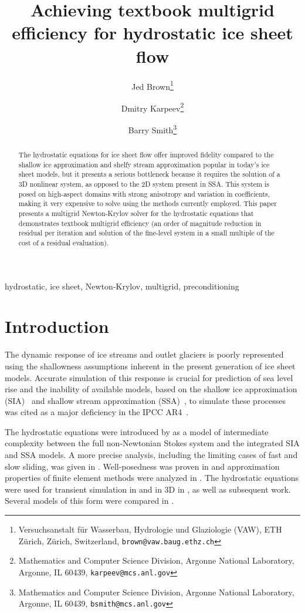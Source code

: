 \documentclass[10pt,letterpaper,oneeqnum,final]{siamltex}
\title{Achieving textbook multigrid efficiency for hydrostatic ice sheet flow}
\author{Jed Brown\thanks{Versuchsanstalt f\"ur Wasserbau, Hydrologie und Glaziologie (VAW), ETH Z\"urich, Z\"urich,
    Switzerland, \texttt{brown@vaw.baug.ethz.ch}}
  \and Dmitry Karpeev\thanks{Mathematics and Computer Science Division, Argonne National Laboratory, Argonne, IL 60439, \texttt{karpeev@mcs.anl.gov}}
  \and Barry Smith\thanks{Mathematics and Computer Science Division, Argonne National Laboratory, Argonne, IL 60439, \texttt{bsmith@mcs.anl.gov}}
}
\begin{document}
\maketitle
\begin{abstract}
  The hydrostatic equations for ice sheet flow offer improved fidelity compared to the shallow ice
  approximation and shelfy stream approximation popular in today's ice sheet models, but
  it presents a serious bottleneck because it requires the solution of a 3D nonlinear system, as
  opposed to the 2D system present in SSA.  This system is posed on high-aspect domains with strong
  anisotropy and variation in coefficients, making it very expensive to solve using the methods
  currently employed.  This paper presents a multigrid Newton-Krylov solver for the hydrostatic
  equations that demonstrates textbook multigrid efficiency (an order of magnitude reduction in
  residual per iteration and solution of the fine-level system in a small multiple of the cost of a
  residual evaluation).
\end{abstract}
\begin{keywords}
  hydrostatic, ice sheet, Newton-Krylov, multigrid, preconditioning
\end{keywords}
\thispagestyle{plain}
\pagestyle{myheadings}

\section{Introduction}
The dynamic response of ice streams and outlet glaciers is poorly represented using the shallowness
assumptions inherent in the present generation of ice sheet models.  Accurate simulation of this
response is crucial for prediction of sea level rise and the inability of available models, based on
the shallow ice approximation (SIA)~\cite{hutter1983tgm} and shallow stream approximation
(SSA)~\cite{morland1987unconfined,weis1999theory}, to simulate these processes was cited as a major
deficiency in the IPCC AR4~\cite{ipcc2007ar4-syr}.

The hydrostatic equations were introduced by \cite{blatter1995vas} as a model of intermediate
complexity between the full non-Newtonian Stokes system and the integrated SIA and SSA models.  A
more precise analysis, including the limiting cases of fast and slow sliding, was given in
\cite{schoof2010thin}.  Well-posedness was proven in \cite{colinge1999strongly} and approximation
properties of finite element methods were analyzed in
\cite{glowinski2003approximation,chow2004finite}.  The hydrostatic equations were used for transient
simulation in \cite{pattyn2002tgr} and in 3D in \cite{pattyn2003ntd}, as well as subsequent work.
Several models of this form were compared in \cite{pattyn2008beh}.
\end{document}
